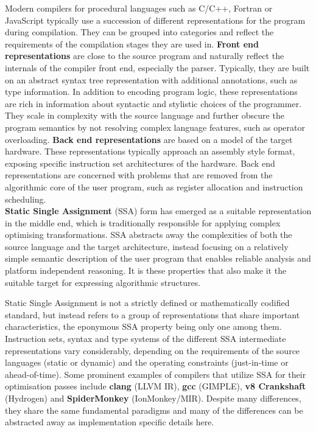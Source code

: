     Modern compilers for procedural languages such as
    C/C++, Fortran or JavaScript typically use a succession of different
    representations for the program during compilation.
    They can be grouped into categories and reflect the requirements of
    the compilation stages they are used in.
    \linebreak
    {\bf Front end representations} are close to the source program and
    naturally reflect the internals of the compiler front end, especially the
    parser.
    Typically, they are built on an abstract syntax tree representation with
    additional annotations, such as type information.
    In addition to encoding program logic, these representations are rich in
    information about syntactic and  stylistic choices of the programmer.
    They scale in complexity with the source language and further obscure the
    program semantics by not resolving complex language features, such as
    operator overloading.
    \linebreak
    {\bf Back end representations} are based on a model of the target hardware.
    These representations typically approach an assembly style format,
    exposing specific instruction set architectures of the hardware.
    Back end representations are concerned with problems that are removed from
    the algorithmic core of the user program, such as register allocation and
    instruction scheduling.
    \\
    {\bf Static Single Assignment} (SSA) form has emerged as a suitable
    representation in the middle end, which is traditionally responsible for
    applying complex optimising transformations.
    SSA abstracts away the complexities of both the source language and the
    target architecture, instead focusing on a relatively simple semantic
    description of the user program that enables reliable analysis and platform
    independent reasoning.
    It is these properties that also make it the suitable target for expressing
    algorithmic structures.

    Static Single Assignment is not a strictly defined or mathematically
    codified standard, but instead refers to a group of representations that
    share important characteristics,
    the eponymous SSA property being only one among them.
    Instruction sets, syntax and type systems of the different
    SSA intermediate representations vary considerably, depending on the
    requirements of the source languages (static or dynamic)
    and the operating constraints (just-in-time or ahead-of-time).
    Some prominent examples of compilers that utilize SSA for their
    optimisation passes include {\bf clang} (LLVM IR), {\bf gcc} (GIMPLE),
    {\bf v8 Crankshaft} (Hydrogen) and {\bf SpiderMonkey} (IonMonkey/MIR).
    Despite many differences, they share the same fundamental paradigms
    and many of the differences can be abstracted away as implementation
    specific details here.


